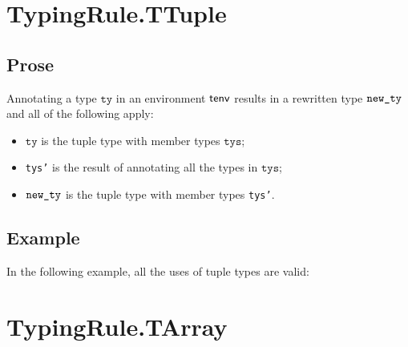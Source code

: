 \documentclass{book}
\newcommand\tty[0]{\texttt{ty}}
\newcommand\tys[0]{\texttt{tys}}
\begin{document}


\section{TypingRule.TTuple \label{sec:TypingRule.TTuple}}

\subsection{Prose}
Annotating a type $\tty$ in an environment $\textsf{tenv}$ results in a
rewritten type $\texttt{new\_ty}$ and all of the following apply:
\begin{itemize}
  \item $\tty$ is the tuple type with member types $\tys$;
  \item \texttt{tys'} is the result of annotating all the types in
    $\tys$;
  \item $\texttt{new\_ty}$ is the tuple type with member types \texttt{tys'}.
\end{itemize}

\subsection{Example}
In the following example, all the uses of tuple types are valid:







\section{TypingRule.TArray \label{sec:TypingRule.TArray}}
\end{document}

